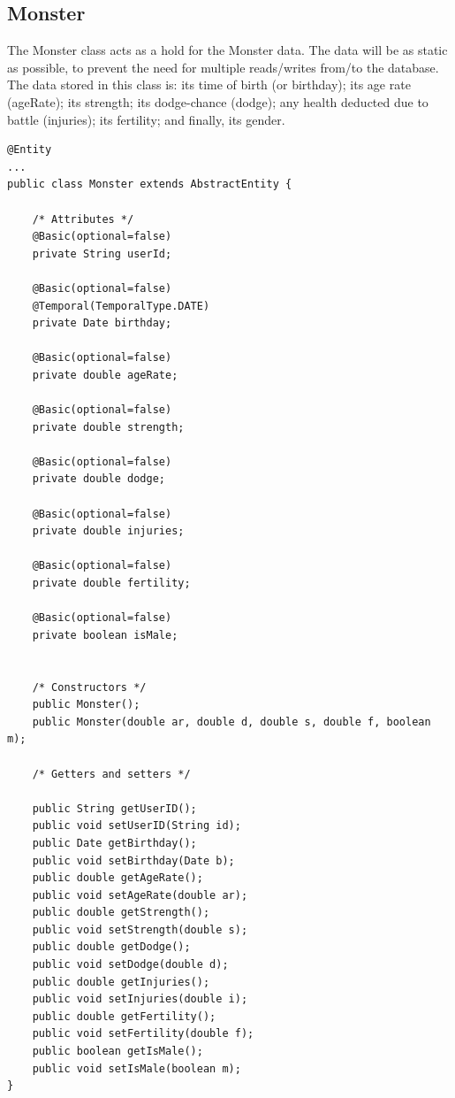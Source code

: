 \clearpage
\subsection{Monster} The Monster class acts as a hold for the Monster data. The data will be as static as possible, to prevent the need for multiple reads/writes from/to the database. The data stored in this class is: its time of birth (or birthday); its age rate (ageRate); its strength; its dodge-chance (dodge); any health deducted due to battle (injuries); its fertility; and finally, its gender.

\begin{small}\begin{verbatim}
@Entity
...
public class Monster extends AbstractEntity {
    
    /* Attributes */
    @Basic(optional=false)
    private String userId;
    
    @Basic(optional=false)
    @Temporal(TemporalType.DATE)
    private Date birthday;
    
    @Basic(optional=false)
    private double ageRate;
    
    @Basic(optional=false)
    private double strength;
    
    @Basic(optional=false)
    private double dodge;
    
    @Basic(optional=false)
    private double injuries;
    
    @Basic(optional=false)
    private double fertility;
    
    @Basic(optional=false)
    private boolean isMale;
    
    
    /* Constructors */
    public Monster();
    public Monster(double ar, double d, double s, double f, boolean m);
    
    /* Getters and setters */
    
    public String getUserID();
    public void setUserID(String id);
    public Date getBirthday();
    public void setBirthday(Date b);
    public double getAgeRate();
    public void setAgeRate(double ar);
    public double getStrength();
    public void setStrength(double s);
    public double getDodge();
    public void setDodge(double d);
    public double getInjuries();
    public void setInjuries(double i);
    public double getFertility();
    public void setFertility(double f);
    public boolean getIsMale();
    public void setIsMale(boolean m);
}
\end{verbatim}\end{small}
